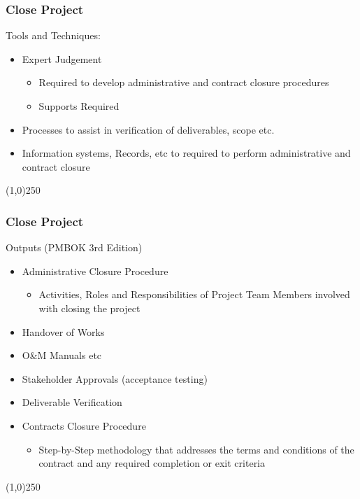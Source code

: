 \begin{frame}
\frametitle{Close Project}
Tools and Techniques:
\begin{itemize}
	\item Expert Judgement
\begin{itemize}
	\item Required to develop administrative and contract closure procedures
	\item Supports Required
\end{itemize}
	\item Processes to assist in verification of deliverables, scope etc.
	\item Information systems, Records, etc to required to perform administrative and contract closure
\end{itemize}
\end{frame}\begin{center}\line(1,0){250}\end{center}
%
%

\begin{frame}
\frametitle{Close Project}
Outputs (PMBOK 3rd Edition)
\begin{itemize}
	\item Administrative Closure Procedure
		\begin{itemize}
			\item Activities, Roles and Responsibilities of Project Team Members involved with closing the project
		\end{itemize}
	\item Handover of Works
	\item O\&M Manuals etc
	\item Stakeholder Approvals (acceptance testing)
	\item Deliverable Verification
	\item Contracts Closure Procedure
		\begin{itemize}
			\item Step-by-Step methodology that addresses the terms and conditions of the contract and any required completion or exit criteria
		\end{itemize}
\end{itemize}
\end{frame}\begin{center}\line(1,0){250}\end{center}

